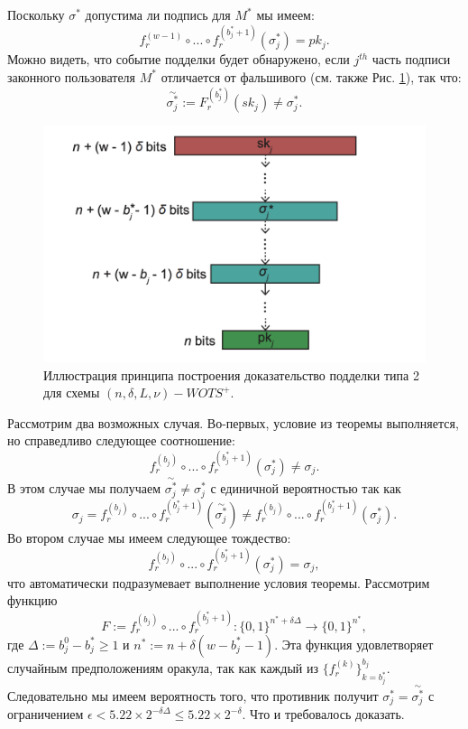 \documentclass[a4paper, 14pt]{extarticle}
\begin{document}
Поскольку $\sigma^{*}$ допустима ли подпись для $M^{*}$ мы имеем:
\[f^{(w - 1)}_{r} \circ ... \circ f^{(b^{*}_{j} + 1)}_{r}(\sigma^{*}_{j}) = pk_{j}.\]
Можно видеть, что событие подделки будет обнаружено, если $j^{th}$ часть подписи законного пользователя $M^{*}$ отличается от фальшивого (см. также Рис. \ref{fig:wots2}), так что:
\[\stackrel{\sim}{\sigma^{*}_{j}} := F^{(b^{*}_{j})}_{r}(sk_{j}) \neq \sigma^{*}_{j}.\]
\begin{figure}[h]
    \centering
    \includegraphics[scale=0.7]{WOTS+_2.png}
    \caption{Иллюстрация принципа построения доказательство подделки типа 2 для схемы $(n, \delta, L, \nu)-WOTS^{+}$. }
    \label{fig:wots2}
\end{figure}
Рассмотрим два возможных случая. Во-первых, условие из теоремы выполняется, но справедливо следующее соотношение:
\[f^{(b_{j})}_{r} \circ ... \circ f^{(b^{*}_{j}+1)}_{r}(\sigma^{*}_{j}) \neq \sigma_{j}.\]
В этом случае мы получаем $\stackrel{\sim}{\sigma^{*}_{j}} \neq \sigma^{*}_{j}$ с единичной вероятностью так как
\[\sigma_{j} = f^{(b_{j})}_{r} \circ ... \circ f^{(b^{*}_{j}+1)}_{r}(\stackrel{\sim}{\sigma^{*}_{j}}) \neq f^{(b_{j})}_{r} \circ ... \circ f^{(b^{*}_{j}+1)}_{r}(\sigma^{*}_{j}).\]
Во втором случае мы имеем следующее тождество:
\[f^{(b_{j})}_{r} \circ ... \circ f^{(b^{*}_{j}+1)}_{r}(\sigma^{*}_{j}) = \sigma_{j},\]
что автоматически подразумевает выполнение условия теоремы. Рассмотрим функцию
\[F := f^{(b_{j})}_{r} \circ ... \circ f^{(b^{*}_{j}+1)}_{r} : \{0, 1\}^{n^{*} + \delta \Delta} \rightarrow \{0,1\}^{n^{*}},\]
где $\Delta := b^{0}_{j} - b^{*}_{j} \geq 1$ и $n^{*} := n + \delta(w - b^{*}_{j} - 1)$. Эта функция удовлетворяет случайным предположениям оракула, так как каждый из $\{f^{(k)}_{r}\}^{b_{j}}_{k=b^{*}_{j}}$. Следовательно мы имеем вероятность того, что противник получит $\sigma^{*}_{j} = \stackrel{\sim}{\sigma^{*}_{j}}$ с ограничением $\epsilon < 5.22 \times 2^{-\delta \Delta} \leq 5.22 \times 2^{-\delta}$. Что и требовалось доказать.
\newpage
\end{document}
